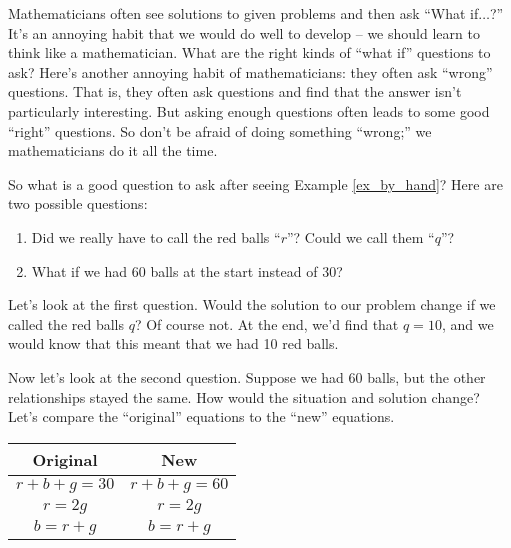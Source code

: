 \medskip


Mathematicians often see solutions to given problems and then ask ``What if$\ldots$?'' It's an annoying habit that we would do well to develop -- we should learn to think like a mathematician. What are the right kinds of ``what if'' questions to ask? Here's another annoying habit of mathematicians: they often ask ``wrong'' questions. That is, they often ask questions and find that the answer isn't particularly interesting. But asking enough questions often leads to some good ``right'' questions. So don't be afraid of doing something ``wrong;'' we mathematicians do it all the time.

%

So what is a good question to ask after seeing Example \ref{ex_by_hand}? Here are two possible questions:
		\begin{enumerate}
		\item		Did we really have to call the red balls ``$r$''? Could we call them ``$q$''?
		\item		What if we had 60 balls at the start instead of 30? 
		\end{enumerate}
		
Let's look at the first question. Would the solution to our problem change if we called the red balls $q$? Of course not. At the end, we'd find that $q = 10$, and we would know that this meant that we had 10 red balls. 

Now let's look at the second question. Suppose we had 60 balls, but the other relationships stayed the same. How would the situation and solution change? Let's compare the ``original'' equations to the ``new'' equations.
\begin{center}\begin{tabular}{c|c} Original & New \\ \hline $r+b+g=30$ & $r+b+g=60$ \\ $r=2g$ & $r=2g$ \\ $b=r+g$ & $b=r+g$ \\ \end{tabular}\end{center}

